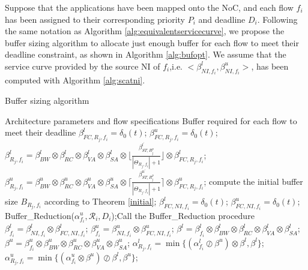 \documentclass[preprint]{elsarticle}
\begin{document}
Suppose that the applications have been mapped onto the NoC, and each flow $f_i$ has been assigned to their corresponding priority $P_i$ and deadline $D_i$. Following the same notation as Algorithm \ref{alg:equivalentservicecurve}, we propose the buffer sizing algorithm to allocate just enough buffer for each flow to meet their deadline constraint, as shown in Algorithm \ref{alg:bufopt}. We assume that the service curve provided by the source NI of $f_i$,i.e. $<\beta_{NI,f_i}^l,\beta_{NI,f_i}^u>$, has been computed with Algorithm \ref{alg:scatni}.
\begin{algorithm}[!ht]
\caption{Buffer sizing algorithm}
\label{alg:bufopt}
\begin{algorithmic}[1]
\Require Architecture parameters and flow specifications
\Ensure Buffer required for each flow to meet their deadline
            \State $\beta_{FC,R_j,f_i}^l=\delta_0(t)$; $\beta_{FC,R_j,f_i}^u=\delta_0(t)$;
            \State $\beta_{R_j,f_i}^l=\beta_{BW}^l\otimes\beta_{RC}^l\otimes\beta_{VA}^l\otimes\beta_{SA}^l\otimes\lfloor\frac{\beta_{ST,R_j^{p}}^{l^\prime}}{|\Theta_{R_j,f_i}|+1}\rfloor\otimes\beta_{FC,R_j,f_i}^l$;
            \State $\beta_{R_j,f_i}^u=\beta_{BW}^u\otimes\beta_{RC}^u\otimes\beta_{VA}^u\otimes\beta_{SA}^u\otimes\lceil\frac{\beta_{ST,R_j^{p}}^{u^\prime}}{|\Theta_{R_j,f_i}|+1}\rceil\otimes\beta_{FC,R_j,f_i}^u$;
            \State compute the initial buffer size $B_{R_j,f_i}$ according to Theorem \ref{initial};
        \EndFor
        \State $\beta_{FC,NI,f_i}^l=\delta_0(t)$; $\beta_{FC,NI,f_i}^u=\delta_0(t)$;
        \State Buffer\_Reduction($\alpha^u_{f_i},\mathcal{R}_i,D_i$);\Comment Call the Buffer\_Reduction procedure
        \State $\beta_{f_i}^l=\beta_{NI,f_i}^l\otimes\beta_{FC,NI,f_i}^l$; $\beta_{f_i}^u=\beta_{NI,f_i}^u\otimes\beta_{FC,NI,f_i}^u$;
                \State $\beta^l=\beta^l_{f_i}\otimes\beta_{BW}^l\otimes\beta_{RC}^l\otimes\beta_{VA}^l\otimes\beta_{SA}^l$;
                \State $\beta^u=\beta^u_{f_i}\otimes\beta_{BW}^u\otimes\beta_{RC}^u\otimes\beta_{VA}^u\otimes\beta_{SA}^u$;
                \State $\alpha^l_{R_j,f_i}=\min\{(\alpha^l_{f_i}\oslash\beta^u)\otimes\beta^l,\beta^l\}$;
                \State $\alpha^u_{R_j,f_i}=\min\{(\alpha^u_{f_i}\otimes\beta^u)\oslash\beta^l,\beta^u\}$;

\end{algorithmic}
\end{algorithm}
\end{document}
